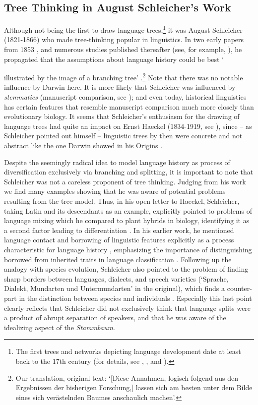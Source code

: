 \documentclass[svgnames,12pt]{scrartcl}
\begin{document}
\subsection{Tree Thinking in August Schleicher's Work}
Although not being the first to draw language trees,\footnote{The first trees and networks depicting
language development date at least back to the 17th century (for details, see \citealt{List2016h},
\citealt{Morrison2016}, and \citealt{Sutrop2012}).} it was August Schleicher (1821-1866) who made
tree-thinking popular in linguistics. In two early papers from 1853
\citep{Schleicher1853,Schleicher1853a}, and numerous studies published thereafter (see, for example,
\citealt{Schleicher1861,Schleicher1863}), he propagated that the assumptions about language history
could be best `{illustrated by the image of a branching tree'
\citep[787]{Schleicher1853}.\footnote{Our translation, original text: `[Diese Annahmen, logisch
folgend aus den Ergebnissen der bisherigen Forschung,] lassen sich am besten unter dem Bilde eines
sich verästelnden Baumes anschaulich machen'.} Note that there was no notable influence by Darwin
here. It is more likely that Schleicher was influenced by \emph{stemmatics} (manuscript comparison,
see \citealt[8]{Hoenigswald1963}); and even today, historical linguistics has certain features that
resemble manuscript comparison much more closely than evolutionary biology. It seems that
Schleicher's enthusiasm for the drawing of language trees had quite an impact on Ernst Haeckel
(1834-1919, see \citealt{Sutrop2012}), since – as Schleicher pointed out himself
\citep[14]{Schleicher1863} – linguistic trees by then were concrete and not abstract like the one
Darwin showed in his Origins \citep{Darwin1859}.
 
Despite the seemingly radical idea to model language history as process of diversification
exclusively via branching and splitting, it is important to note that Schleicher was not a careless
proponent of tree thinking. Judging from his work we find many examples showing that he was aware of
potential problems resulting from the tree model. Thus, in his open letter to Haeckel, Schleicher,
taking Latin and its descendants as an example, explicitly pointed to problems of language mixing
which he compared to plant hybrids in biology, identifying it as a second factor leading to
differentiation \citep[18]{Schleicher1863}. 
In his earlier work, he mentioned language contact and
borrowing of linguistic features explicitly as a process characteristic for language history \citep[6]{Schleicher1861}, emphasizing the importance of
distinguishing borrowed from inherited traits in language classification \citep[30]{Schleicher1848}.
Following up the analogy with species evolution, Schleicher also pointed to the problem of finding
sharp borders between languages, dialects, and speech varieties (`Sprache, Dialekt, Mundarten und
Untermundarten' in the original), which finds a counter-part in the distinction between species and
individuals \citep[21]{Schleicher1863}. Especially this last point clearly reflects
that Schleicher did not exclusively think that
language splits were a product of abrupt separation of speakers, and that he was aware of the
idealizing aspect of the \emph{Stammbaum}.
}
\end{document}
